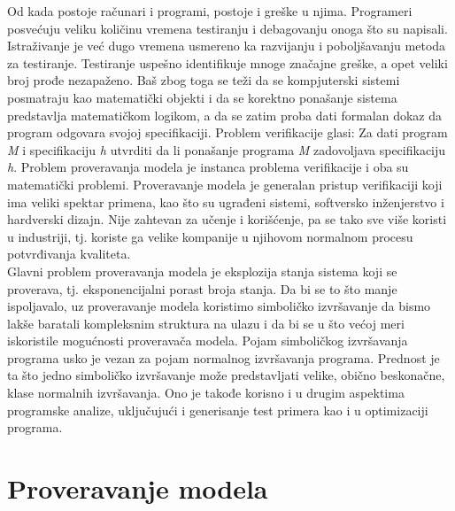\documentclass[a4paper]{article}
\begin{document}
Od kada postoje računari i programi, postoje i greške u njima. Programeri posvećuju veliku količinu vremena testiranju i debagovanju onoga što su napisali. Istraživanje je već dugo vremena usmereno ka razvijanju i poboljšavanju metoda za testiranje. Testiranje uspešno identifikuje mnoge značajne greške, a opet veliki broj prođe nezapaženo. Baš zbog toga se teži da se kompjuterski sistemi posmatraju kao matematički objekti i da se korektno ponašanje sistema predstavlja matematičkom logikom, a da se zatim proba dati formalan dokaz da program odgovara svojoj specifikaciji. Problem verifikacije glasi: Za dati program \textit{M} i specifikaciju \textit{h} utvrditi da li ponašanje programa \textit{M} zadovoljava specifikaciju \textit{h}. Problem proveravanja modela je instanca problema verifikacije i oba su matematički problemi. Proveravanje modela je generalan pristup verifikaciji koji ima veliki spektar primena, kao što su ugrađeni sistemi, softversko inženjerstvo i hardverski dizajn. Nije zahtevan za učenje i korišćenje, pa se tako sve više koristi u industriji, tj. koriste ga velike kompanije u njihovom normalnom procesu potvrđivanja kvaliteta. \\ 

Glavni problem proveravanja modela je eksplozija stanja sistema koji se proverava, tj. eksponencijalni porast broja stanja. Da bi se to što manje ispoljavalo, uz proveravanje modela koristimo simboličko izvršavanje da bismo lakše baratali kompleksnim struktura na ulazu i da bi se u što većoj meri iskoristile mogućnosti proveravača modela. Pojam simboličkog izvršavanja programa usko je vezan za pojam normalnog izvršavanja programa. Prednost je ta što jedno simboličko izvršavanje može predstavljati velike, obično beskonačne, klase normalnih izvršavanja. Ono je takođe korisno i u drugim aspektima programske analize, uključujući i generisanje test primera kao i u optimizaciji programa.

\section{Proveravanje modela}
\label{sec:naslov1}
\end{document}
